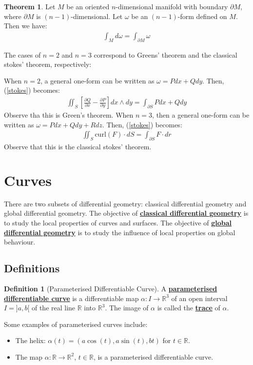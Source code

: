 \documentclass[11pt]{scrartcl}
\newcommand{\R}[0]{\mathbb{R}}
\theoremstyle{definition}
\newtheorem{theorem}{Theorem}
\newtheorem{definition}{Definition}
\theoremstyle{remark}
\newcommand{\dfn}[1]{\textbf{\underline{#1}}}
\newcommand{\idx}[2]{\int_{#1}^{#2}}
\begin{document}
{\begin{theorem}
	Let $M$ be an oriented $n$-dimensional manifold with boundary $\partial M$, where $\partial M$ is $(n-1)$-dimensional. Let $\omega$ be an $(n-1)$-form defined on $M$. Then we have: 
	\begin{align}\label{stokes} 
		\idx{M}{} d \omega = \idx{\partial M}{} \omega 	
	\end{align}
\end{theorem}

The cases of $n=2$ and $n=3$ correspond to Greens' theorem and the classical stokes' theorem, respectively: 

When $n=2$, a general one-form can be written as $\omega = Pdx + Qdy$. Then, (\ref{stokes}) becomes: 
\begin{align}
	\iint_S \left[ \frac{\partial{Q}}{\partial x } - \frac{\partial P}{\partial y} \right] dx \wedge dy = \idx{\partial S}{} P dx + Q dy
\end{align}
Observe tha this is Green's theorem. When $n=3$, then a general one-form can be written as $\omega = P dx + Q dy + R dz$. Then, (\ref{stokes}) becomes: 
\begin{align}
	\iint_S \text{curl}(F) \cdot dS = \idx{\partial S}{} F \cdot dr	
\end{align}
Observe that this is the classical stokes' theorem. 

\section{Curves}
There are two subsets of differential geometry: classical differential geometry and global differential geometry. The objective of \dfn{classical differential geometry} is to study the local properties of curves and surfaces. The objective of \dfn{global differential geometry} is to study the influence of local properties on global behaviour. 
\subsection{Definitions}

\begin{definition}[Parameterised Differentiable Curve] 
	A \dfn{parameterised differentiable curve} is a differentiable map $ \alpha: I \rightarrow \R^3$ of an open interval $I = ]a,b[$ of the real line $\R$ into $\R^3$. The image of $\alpha$ is called the \dfn{trace} of $\alpha$. 
\end{definition}

Some examples of parameterised curves include: 
\begin{itemize}[noitemsep]
	\item The helix: $\alpha(t) = (a \cos (t), a \sin(t), bt)$ for $t \in \R$. 
	\item The map $\alpha: \R \rightarrow \R^2$, $t \in \R$, is a parameterised differentiable curve. 
\end{itemize}

}
\end{document}
